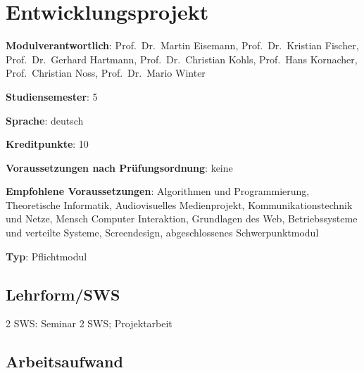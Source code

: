 \chapter{Entwicklungsprojekt\label{/mi-2017/modulbeschreibungen-bachelor/BA_Entwicklungsprojekt}}\label{entwicklungsprojektpathlabelmi-2017modulbeschreibungen-bachelorbaux5fentwicklungsprojekt}

\begin{modulHead}
\textbf{Modulverantwortlich}: Prof.~Dr.~Martin
Eisemann, Prof.~Dr.~Kristian Fischer, Prof.~Dr.~Gerhard Hartmann,
Prof.~Dr.~Christian Kohls, Prof.~Hans Kornacher, Prof.~Christian Noss,
Prof.~Dr.~Mario
Winter
\end{modulHead}
\begin{modulHead}
\textbf{Studiensemester}:
5
\end{modulHead}
\begin{modulHead}
\textbf{Sprache}:
deutsch
\end{modulHead}
\begin{modulHead}
\textbf{Kreditpunkte}:
10
\end{modulHead}
\begin{modulHead}
\textbf{Voraussetzungen nach
Prüfungsordnung}:
keine
\end{modulHead}
\begin{modulHead}
\textbf{Empfohlene
Voraussetzungen}: Algorithmen und Programmierung, Theoretische
Informatik, Audiovisuelles Medienprojekt, Kommunikationstechnik und
Netze, Mensch Computer Interaktion, Grundlagen des Web, Betriebssysteme
und verteilte Systeme, Screendesign, abgeschlossenes
Schwerpunktmodul
\end{modulHead}
\begin{modulHead}
\textbf{Typ}:
Pflichtmodul
\end{modulHead}


\section*{Lehrform/SWS\label{/mi-2017/modulbeschreibungen-bachelor/BA_Entwicklungsprojekt}}\label{lehrformswspathlabelmi-2017modulbeschreibungen-bachelorbaux5fentwicklungsprojekt}

2 SWS: Seminar 2 SWS; Projektarbeit

\section*{Arbeitsaufwand\label{/mi-2017/modulbeschreibungen-bachelor/BA_Entwicklungsprojekt}}\label{arbeitsaufwandpathlabelmi-2017modulbeschreibungen-bachelorbaux5fentwicklungsprojekt}

